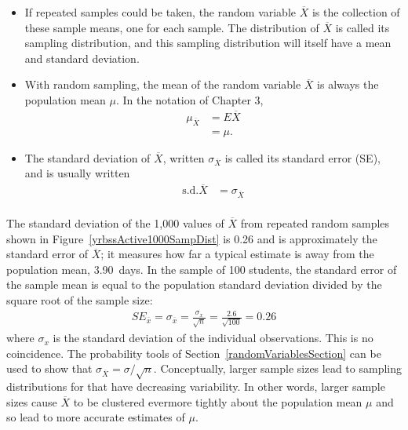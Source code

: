 \begin{spacing}{1.5}
\begin{itemize}
  \item If repeated samples could be taken, the random variable $\overline{X}$ is the collection of these sample means, one for each sample.  The distribution of $\overline{X}$ is called its sampling distribution, and this sampling distribution will itself have a mean and standard deviation. 
  
  \item With random sampling, the mean of the random variable $\overline{X}$ is always the population mean $\mu$.  In the notation of Chapter 3, 
\begin{align*}
	 \mu_{\overline{X}} &= E\overline{X} \\
	 &= \mu.
\end{align*}
  
  \item  The standard deviation of $\overline{X}$, written $\sigma_{\overline{X}}$ is called its standard error (SE), and is usually written
  \begin{align*}
  	 \text{s.d.}\overline{X} &=\sigma_{\overline{X}} \\
 \end{align*}

\end{itemize}

The standard deviation of the 1,000 values of $\overline{X}$ from repeated random samples shown in Figure~\ref{yrbssActive1000SampDist} is 0.26 and is approximately the standard error of $\overline{X}$; it measures 
how far a typical estimate is away from the population mean, 3.90~days. In the sample of 100 students, the standard error of the sample mean is equal to the population standard deviation divided by the square root of the sample size:
\begin{eqnarray*}
SE_{\overline{x}} = \sigma_{\overline{x}} = \frac{\sigma_{x}}{\sqrt{n}} = \frac{2.6}{\sqrt{100}} = 0.26
\end{eqnarray*}
where $\sigma_{x}$ is the standard deviation of the individual observations. This is no coincidence. The probability tools of Section~\ref{randomVariablesSection} can be used to show that $\sigma_{\overline{X}} = \sigma/\sqrt{n}$.  Conceptually, larger sample sizes lead  to sampling distributions for that have decreasing variability. In other words, larger sample sizes cause $\overline{X}$ to be clustered evermore tightly about the population mean $\mu$ and so lead to more accurate estimates of $\mu$.


\end{spacing}
